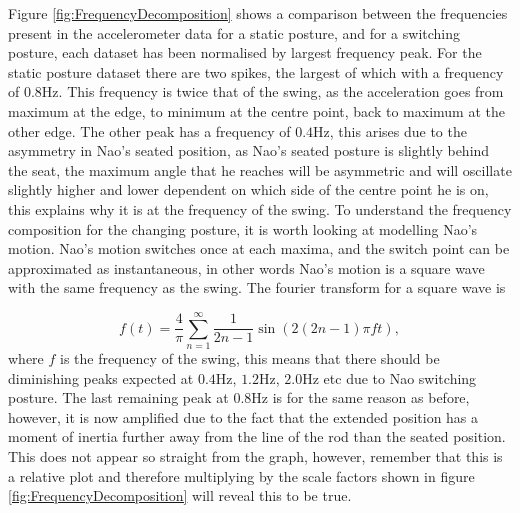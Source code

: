 \documentclass[11pt]{article}
\begin{document}
Figure \ref{fig:FrequencyDecomposition} shows a comparison between the frequencies present in the accelerometer data for a static posture, and for a switching posture, each dataset has been normalised by largest frequency peak. For the static posture dataset there are two spikes, the largest of which with a frequency of $0.8$Hz. This frequency is twice that of the swing, as the acceleration goes from maximum at the edge, to minimum at the centre point, back to maximum at the other edge. The other peak has a frequency of $0.4$Hz, this arises due to the asymmetry in Nao's seated position, as Nao's seated posture is slightly behind the seat, the maximum angle that he reaches will be asymmetric and will oscillate slightly higher and lower dependent on which side of the centre point he is on, this explains why it is at the frequency of the swing. To understand the frequency composition for the changing posture, it is worth looking at modelling Nao's motion. Nao's motion switches once at each maxima, and the switch point can be approximated as instantaneous, in other words Nao's motion is a square wave with the same frequency as the swing. The fourier transform for a square wave is

\begin{equation}
    f(t) = \frac{4}{\pi}\sum_{n=1}^{\infty} \frac{1}{2n-1}\sin(2(2n-1)\pi ft),
\end{equation}
where $f$ is the frequency of the swing, this means that there should be diminishing peaks expected at $0.4$Hz, $1.2$Hz, $2.0$Hz etc due to Nao switching posture. The last remaining peak at $0.8$Hz is for the same reason as before, however, it is now amplified due to the fact that the extended position has a moment of inertia further away from the line of the rod than the seated position. This does not appear so straight from the graph, however, remember that this is a relative plot and therefore multiplying by the scale factors shown in figure \ref{fig:FrequencyDecomposition} will reveal this to be true.\\
\end{document}
